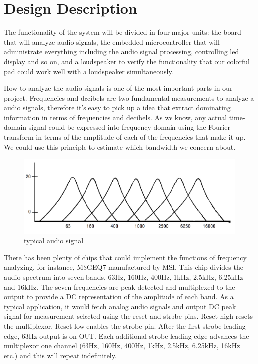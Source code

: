 \documentclass[12pt,a4paper,journal]{IEEEtran}
\begin{document}
\section{Design Description}

The functionality of the system will be divided in four major units: the board that will analyze audio signals, the embedded microcontroller that will administrate everything including the audio signal processing, controlling led display and so on, and a loudspeaker to verify the functionality that our colorful pad could work well with a loudspeaker simultaneously.

How to analyze the audio signals is one of the most important parts in our project. Frequencies and decibels are two fundamental measurements to analyze a audio signals, therefore it's easy to pick up a idea that extract dominating information in terms of frequencies and decibels. As we know, any actual time-domain signal could be expressed into frequency-domain using the Fourier transform in terms of the amplitude of each of the frequencies that make it up. We could use this principle to estimate which bandwidth we concern about.
\begin{figure}[ht]
  \centering
  \includegraphics[width=0.9\linewidth]{frequencyaudio.png}
  \caption{typical audio signal}
  \label{fig:tas3}
\end{figure}
There has been plenty of chips that could implement the functions of frequency analyzing, for instance, MSGEQ7 manufactured by MSI. This chip divides the audio spectrum into seven bands, 63Hz, 160Hz, 400Hz, 1kHz, 2.5kHz, 6.25kHz and 16kHz. The seven frequencies are peak detected and multiplexed to the output to provide a DC representation of the amplitude of each band. As a typical application, it would fetch analog audio signals and output DC peak signal for measurement selected using the reset and strobe pins. Reset high resets the multiplexor. Reset low enables the strobe pin. After the first strobe leading edge, 63Hz output is on OUT. Each additional strobe leading edge advances the multiplexor one channel (63Hz, 160Hz, 400Hz, 1kHz, 2.5kHz, 6.25kHz, 16kHz etc.) and this will repeat indefinitely.
\end{document}
